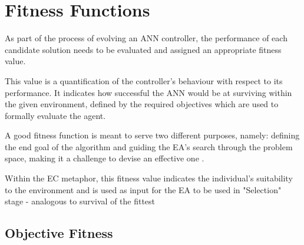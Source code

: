 \section{Fitness Functions}


As part of the process of evolving an ANN controller, the performance of each candidate solution needs to be evaluated and assigned an appropriate fitness value. 

This value is a quantification of the controller's behaviour with respect to its performance. It indicates how successful the ANN would be at surviving within the given environment, defined by the required objectives which are used to formally evaluate the agent.

A good fitness function is meant to serve two different purposes, namely: defining the end goal of the algorithm and guiding the EA's search through the problem space, making it a challenge to devise an effective one \cite{RefWorks:9}.

Within the EC metaphor, this fitness value indicates the individual's suitability to the environment and is used as input for the EA to be used in "Selection" stage  - analogous to survival of the fittest




\subsection{Objective Fitness}

